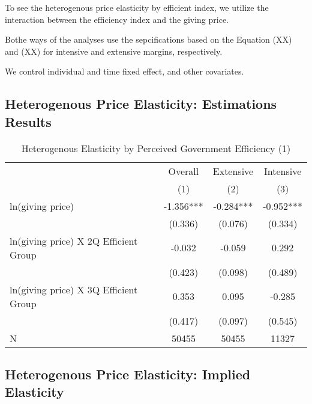 \documentclass[ review  , 3p ]{elsarticle}
\begin{document}
  To see the heterogenous price elasticity by efficient index,
  we utilize the interaction between the efficiency index and the giving price.
  
  Bothe ways of the analyses use the sepcifications based on the Equation (XX) and (XX) for intensive and extensive margins,
  respectively.
  
  We control individual and time fixed effect,
  and other covariates.
  
  \hypertarget{heterogenous-price-elasticity-estimations-results}{%
  \subsection{Heterogenous Price Elasticity: Estimations Results}\label{heterogenous-price-elasticity-estimations-results}}
  
  \begin{table}
  
  \caption{\label{tab:kableHeteroElasticitySlide1}Heterogenous Elasticity by Perceived Government Efficiency (1)}
  \centering
  \fontsize{8}{10}\selectfont
  \begin{tabular}[t]{lccc}
  \toprule
  \multicolumn{1}{c}{ } & \multicolumn{1}{c}{Overall} & \multicolumn{1}{c}{Extensive} & \multicolumn{1}{c}{Intensive} \\
  \cmidrule(l{3pt}r{3pt}){2-2} \cmidrule(l{3pt}r{3pt}){3-3} \cmidrule(l{3pt}r{3pt}){4-4}
   & (1) & (2) & (3)\\
  \midrule
  ln(giving price) & -1.356*** & -0.284*** & -0.952***\\
   & (0.336) & (0.076) & (0.334)\\
  ln(giving price) X 2Q Efficient Group & -0.032 & -0.059 & 0.292\\
   & (0.423) & (0.098) & (0.489)\\
  ln(giving price) X 3Q Efficient Group & 0.353 & 0.095 & -0.285\\
   & (0.417) & (0.097) & (0.545)\\
  N & 50455 & 50455 & 11327\\
  \bottomrule
  \end{tabular}
  \end{table}
  
  \hypertarget{heterogenous-price-elasticity-implied-elasticity}{%
  \subsection{Heterogenous Price Elasticity: Implied Elasticity}\label{heterogenous-price-elasticity-implied-elasticity}}
  
\end{document}
